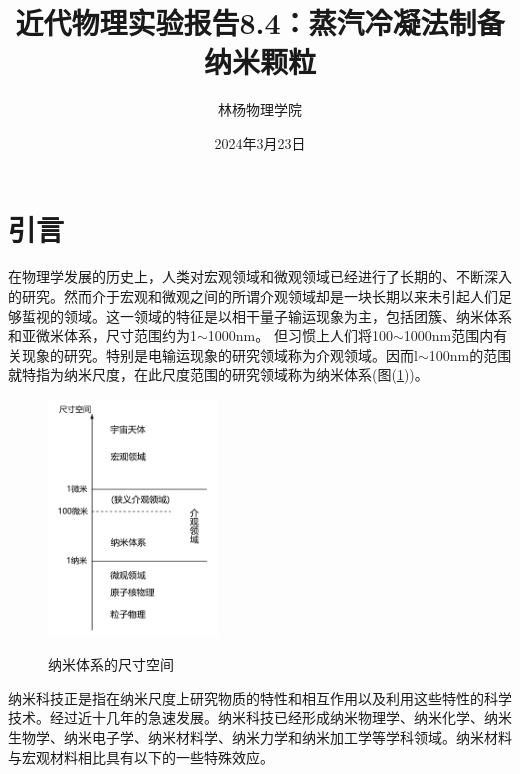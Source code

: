 \documentclass[a4paper]{article}
\title{近代物理实验报告8.4：蒸汽冷凝法制备纳米颗粒}
\author{林杨\quad 211840092\quad 物理学院}
\date{2024年3月23日}
\begin{document}
\maketitle


\section{引言}
在物理学发展的历史上，人类对宏观领域和微观领域已经进行了长期的、不断深入的研究。然而介于宏观和微观之间的所谓介观领域却是一块长期以来未引起人们足够蜇视的领域。这一领域的特征是以相干量子输运现象为主，包括团簇、纳米体系和亚微米体系，尺寸范围约为1$\sim$1000nm。
但习惯上人们将100$\sim$1000nm范围内有关现象的研究。特别是电输运现象的研究领域称为介观领域。因而l$\sim$100nm的范围就特指为纳米尺度，在此尺度范围的研究领域称为纳米体系(图(\ref{fig1}))。
\begin{figure}[!ht]
\centering
\includegraphics[width=0.4\textwidth]{fig/fig1.pdf}\\
\caption{纳米体系的尺寸空间}\label{fig1}
\end{figure}

纳米科技正是指在纳米尺度上研究物质的特性和相互作用以及利用这些特性的科学技术。经过近十几年的急速发展。纳米科技已经形成纳米物理学、纳米化学、纳米生物学、纳米电子学、纳米材料学、纳米力学和纳米加工学等学科领域。纳米材料与宏观材料相比具有以下的一些特殊效应。
\end{document}
